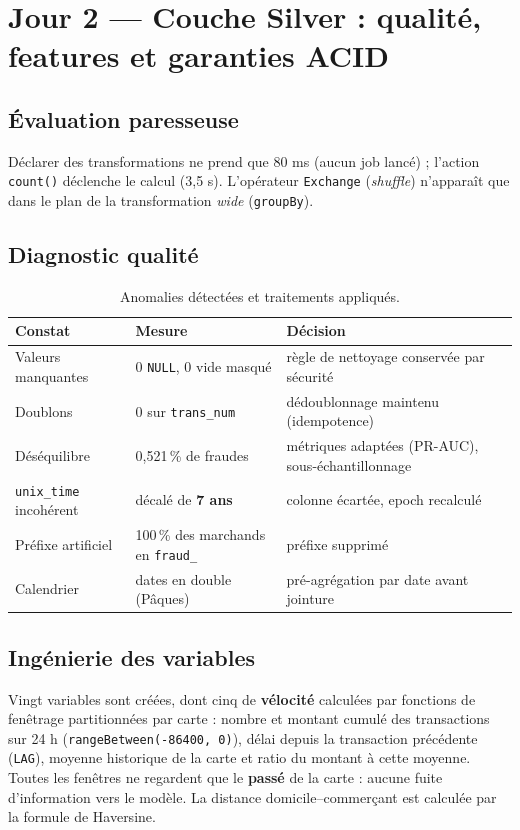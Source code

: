 \documentclass[11pt,a4paper]{article}
\newcommand{\code}[1]{\texttt{\small #1}}
\begin{document}
\section{Jour 2 — Couche Silver : qualité, features et garanties ACID}\label{sec:j2}

\subsection{Évaluation paresseuse}
Déclarer des transformations ne prend que 80 ms (aucun job lancé) ; l'action \code{count()} déclenche le calcul (3,5 s).
L'opérateur \code{Exchange} (\emph{shuffle}) n'apparaît que dans le plan de la transformation \emph{wide} (\code{groupBy}).

\subsection{Diagnostic qualité}
\begin{table}[H]
\centering\small
\begin{tabularx}{\linewidth}{@{}l l Y@{}}
\toprule
\textbf{Constat} & \textbf{Mesure} & \textbf{Décision} \\ \midrule
Valeurs manquantes & 0 \code{NULL}, 0 vide masqué & règle de nettoyage conservée par sécurité \\
Doublons & 0 sur \code{trans\_num} & dédoublonnage maintenu (idempotence) \\
Déséquilibre & 0,521\,\% de fraudes & métriques adaptées (PR-AUC), sous-échantillonnage \\
\code{unix\_time} incohérent & décalé de \textbf{7 ans} & colonne écartée, epoch recalculé \\
Préfixe artificiel & 100\,\% des marchands en \code{fraud\_} & préfixe supprimé \\
Calendrier & dates en double (Pâques) & pré-agrégation par date avant jointure \\
\bottomrule
\end{tabularx}
\caption{Anomalies détectées et traitements appliqués.}
\end{table}

\subsection{Ingénierie des variables}
Vingt variables sont créées, dont cinq de \textbf{vélocité} calculées par fonctions de fenêtrage partitionnées par carte :
nombre et montant cumulé des transactions sur 24 h (\code{rangeBetween(-86400, 0)}), délai depuis la transaction précédente
(\code{LAG}), moyenne historique de la carte et ratio du montant à cette moyenne. Toutes les fenêtres ne regardent que le
\textbf{passé} de la carte : aucune fuite d'information vers le modèle. La distance domicile--commerçant est calculée par la formule
de Haversine.
\end{document}

